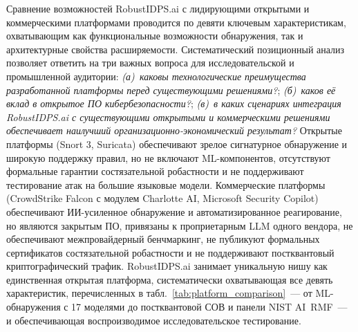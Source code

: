 \label{sec:platform_comparison}%

Сравнение возможностей \textsf{RobustIDPS.ai} с лидирующими открытыми
и коммерческими платформами проводится по девяти ключевым
характеристикам, охватывающим как функциональные возможности
обнаружения, так и архитектурные свойства расширяемости.
Систематический позиционный анализ позволяет ответить на три
важных вопроса для исследовательской и промышленной аудитории:
\emph{(а)~каковы технологические преимущества разработанной
платформы перед существующими решениями?}; \emph{(б)~каков её
вклад в открытое ПО кибербезопасности?}; \emph{(в)~в каких
сценариях интеграция \textsf{RobustIDPS.ai} с существующими
открытыми и коммерческими решениями обеспечивает наилучший
организационно-экономический результат?} Открытые
платформы (\textsf{Snort 3}, \textsf{Suricata}) обеспечивают
зрелое сигнатурное обнаружение и широкую поддержку правил, но не
включают ML-компонентов, отсутствуют формальные гарантии
состязательной робастности и не поддерживают тестирование атак на
большие языковые модели. Коммерческие платформы
(\textsf{CrowdStrike Falcon} с модулем \textsf{Charlotte AI},
\textsf{Microsoft Security Copilot}) обеспечивают ИИ-усиленное
обнаружение и автоматизированное реагирование, но являются
закрытым ПО, привязаны к проприетарным LLM одного вендора, не
обеспечивают межпровайдерный бенчмаркинг, не публикуют формальных
сертификатов состязательной робастности и не поддерживают
постквантовый криптографический трафик. \textsf{RobustIDPS.ai}
занимает уникальную нишу как единственная открытая платформа,
систематически охватывающая все девять характеристик,
перечисленных в табл.~\ref{tab:platform_comparison}~--- от
ML-обнаружения с 17 моделями до постквантовой СОВ и панели NIST
AI~RMF~--- и обеспечивающая воспроизводимое исследовательское
тестирование.

